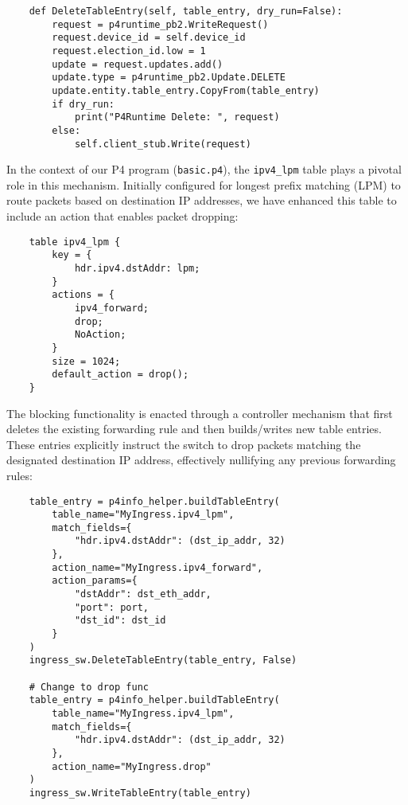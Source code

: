 \begin{lstlisting}
    def DeleteTableEntry(self, table_entry, dry_run=False):
        request = p4runtime_pb2.WriteRequest()
        request.device_id = self.device_id
        request.election_id.low = 1
        update = request.updates.add()
        update.type = p4runtime_pb2.Update.DELETE
        update.entity.table_entry.CopyFrom(table_entry)
        if dry_run:
            print("P4Runtime Delete: ", request)
        else:
            self.client_stub.Write(request)
\end{lstlisting}
In the context of our P4 program (\verb|basic.p4|), the \verb|ipv4_lpm| table plays a pivotal role in this mechanism. Initially configured for longest prefix matching (LPM) to route packets based on destination IP addresses, we have enhanced this table to include an action that enables packet dropping:
\begin{lstlisting}
    table ipv4_lpm {
        key = {
            hdr.ipv4.dstAddr: lpm;
        }
        actions = {
            ipv4_forward;
            drop;
            NoAction;
        }
        size = 1024;
        default_action = drop();
    }
\end{lstlisting}
The blocking functionality is enacted through a controller mechanism that first deletes the existing forwarding rule and then builds/writes new table entries. These entries explicitly instruct the switch to drop packets matching the designated destination IP address, effectively nullifying any previous forwarding rules:
\begin{lstlisting}
    table_entry = p4info_helper.buildTableEntry(
        table_name="MyIngress.ipv4_lpm",
        match_fields={
            "hdr.ipv4.dstAddr": (dst_ip_addr, 32)
        },
        action_name="MyIngress.ipv4_forward",
        action_params={
            "dstAddr": dst_eth_addr,
            "port": port,
            "dst_id": dst_id
        }
    )
    ingress_sw.DeleteTableEntry(table_entry, False)
    
    # Change to drop func
    table_entry = p4info_helper.buildTableEntry(
        table_name="MyIngress.ipv4_lpm",
        match_fields={
            "hdr.ipv4.dstAddr": (dst_ip_addr, 32)
        },
        action_name="MyIngress.drop"
    )
    ingress_sw.WriteTableEntry(table_entry)
\end{lstlisting}
